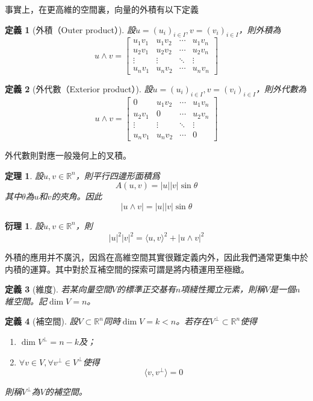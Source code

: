 \documentclass[12pt]{article}
\newcommand{\innerprod}[2]{\langle{#1},{#2}\rangle}
\newtheorem{definition}{定義}
\newtheorem*{theorem}{定理}
\newtheorem*{corollary}{衍理}
\begin{document}
    事實上，在更高維的空間裏，向量的外積有以下定義

    \begin{definition}[外積（Outer product）]
        設$u=(u_i)_{i\in I},v=(v_i)_{i\in I}$，則外積為$$u\wedge v =\begin{bmatrix}
            u_1v_1&u_1v_2&\cdots&u_1v_n\\
            u_2v_1&u_2v_2&\cdots&u_2v_n\\
            \vdots&\vdots&\ddots&\vdots\\
            u_n v_1&u_n v_2&\cdots&u_n v_n
        \end{bmatrix}$$
    \end{definition}

    \begin{definition}[外代數（Exterior product）]
        設$u=(u_i)_{i\in I},v=(v_i)_{i\in I}$，則外代數為$$u\wedge v =\begin{bmatrix}
            0&u_1v_2&\cdots&u_1v_n\\
            u_2v_1&0&\cdots&u_2v_n\\
            \vdots&\vdots&\ddots&\vdots\\
            u_n v_1&u_n v_2&\cdots&0
        \end{bmatrix}$$
    \end{definition}

    外代數則對應一般幾何上的叉積。

    \begin{theorem}
        設$u,v\in \mathbb{R}^n$，則平行四邊形面積爲$$A(u,v)=|u||v|\sin{\theta}$$其中$\theta$為$u$和$v$的夾角。因此$$|u\wedge v|=|u||v|\sin{\theta}$$
    \end{theorem}

    \begin{corollary}
        設$u,v\in \mathbb{R}^n$，則$$|u|^2|v|^2=\innerprod{u}{v}^2+|u\wedge v|^2$$
    \end{corollary}

    外積的應用并不廣汎，因爲在高維空間其實很難定義内外，因此我們通常更集中於内積的運算。其中對於互補空間的探索可謂是將内積運用至極緻。
    
    \begin{definition}[維度]
        若某向量空間$V$的標準正交基有$n$項綫性獨立元素，則稱$V$是一個$n$維空間。記$\dim{V}=n$。
    \end{definition}

    \begin{definition}[補空間]
        設$V \subset \mathbb{R}^n$同時$\dim{V}=k< n$。若存在$V^{\perp}\subset \mathbb{R}^n$使得\begin{enumerate}
            \item $\dim{V^{\perp}}=n-k$及；
            \item $\forall v\in V, \forall v^{\perp}\in V^{\perp}$使得$$\innerprod{v}{v^{\perp}}=0$$
        \end{enumerate}
        則稱$V^{\perp}$為$V$的補空間。
    \end{definition}
\end{document}
